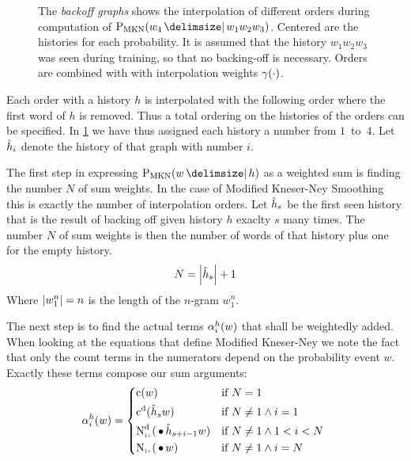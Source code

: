 \begin{figure}[tb]
  \centering
  
  \caption{
    The \emph{backoff graphs} shows the interpolation of different orders during
    computation of $\ProbMKN{w_4}{w_1 w_2 w_3}$.
    Centered are the histories for each probability.
    It is assumed that the history $w_1 w_2 w_3$ was seen during training, so
    that no backing-off is necessary.
    Orders are combined with with interpolation weights $\gamma(\cdot)$.
  }
  \label{fig:history-mkn}
\end{figure}

Each order with a history $h$ is interpolated with the following order where
the first word of $h$ is removed.
Thus a total ordering on the histories of the orders can be specified.
In \cref{fig:history-mkn} we have thus assigned each history a number from
$1$~to~$4$.
Let $\DerivedHistory[i]$ denote the history of that graph with number $i$.

The first step in expressing $\ProbMKN{w}{h}$ as a weighted sum is finding the
number $N$ of sum weights.
In the case of Modified Kneser-Ney Smoothing this is exactly the number of
interpolation orders.
Let $\DerivedHistory[s]$ be the first seen history that is the result of
backing off given history $h$ exaclty $s$ many times.
The number $N$ of sum weights is then the number of words of that history plus
one for the empty history.
\begin{equation}
  N = \NGramLength{\DerivedHistory[s]} + 1
\end{equation}
Where ${\left|w_1^n\right|} = n$ is the length of the $n$-gram $w_1^n$.

The next step is to find the actual terms $\alpha_i^h(w)$ that shall be
weightedly added.
When looking at the equations that define Modified Kneser-Ney we note the fact
that only the count terms in the numerators depend on the probability event $w$.
Exactly these terms compose our sum arguments:
\begin{equation}
  \SumArg_i^h(w) =
    \begin{dcases*}
      \Count(w)                                             & if $N = 1$ \\
      \DiscountedCount(\DerivedHistory[s] w)                & if $N \neq 1 \land i = 1$ \\
      \DiscountedCount*(\WSkp \DerivedHistory[s + i - 1] w) & if $N \neq 1 \land 1 < i < N$ \\
      \ContCountIp(\WSkp w)                                 & if $N \neq 1 \land i = N$
    \end{dcases*}
\end{equation}

